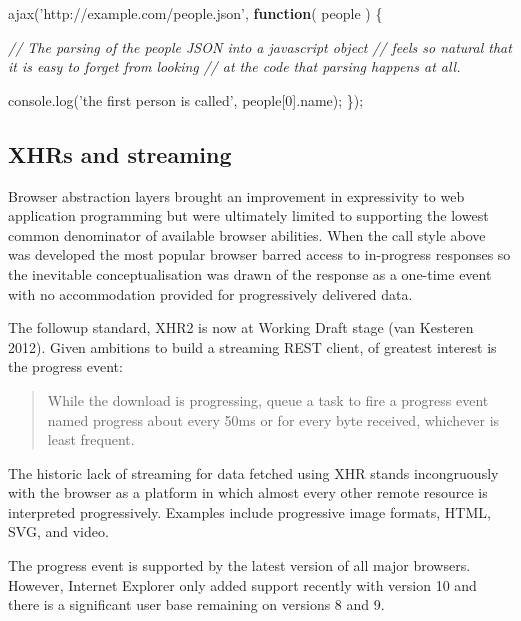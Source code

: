 \documentclass[12pt, ]{article}
\newenvironment{Shaded}{}{}
\newcommand{\KeywordTok}[1]{\textcolor[rgb]{0.00,0.44,0.13}{\textbf{{#1}}}}
\newcommand{\DecValTok}[1]{\textcolor[rgb]{0.25,0.63,0.44}{{#1}}}
\newcommand{\StringTok}[1]{\textcolor[rgb]{0.25,0.44,0.63}{{#1}}}
\newcommand{\CommentTok}[1]{\textcolor[rgb]{0.38,0.63,0.69}{\textit{{#1}}}}
\newcommand{\OtherTok}[1]{\textcolor[rgb]{0.00,0.44,0.13}{{#1}}}
\newcommand{\FunctionTok}[1]{\textcolor[rgb]{0.02,0.16,0.49}{{#1}}}
\newcommand{\NormalTok}[1]{{#1}}
\begin{document}
\begin{Shaded}
\begin{Highlighting}[]
\FunctionTok{ajax}\NormalTok{(}\StringTok{'http://example.com/people.json'}\NormalTok{, }\KeywordTok{function}\NormalTok{( people ) \{}

   \CommentTok{// The parsing of the people JSON into a javascript object}
   \CommentTok{// feels so natural that it is easy to forget from looking }
   \CommentTok{// at the code that parsing happens at all. }
   
   \OtherTok{console}\NormalTok{.}\FunctionTok{log}\NormalTok{(}\StringTok{'the first person is called'}\NormalTok{, people[}\DecValTok{0}\NormalTok{].}\FunctionTok{name}\NormalTok{);}
\NormalTok{\});}
\end{Highlighting}
\end{Shaded}

\subsection{XHRs and streaming}\label{xhrs-and-streaming}

\label{xhrsandstreaming}

Browser abstraction layers brought an improvement in expressivity to web
application programming but were ultimately limited to supporting the
lowest common denominator of available browser abilities. When the call
style above was developed the most popular browser barred access to
in-progress responses so the inevitable conceptualisation was drawn of
the response as a one-time event with no accommodation provided for
progressively delivered data.

The followup standard, XHR2 is now at Working Draft stage (van Kesteren
2012). Given ambitions to build a streaming REST client, of greatest
interest is the progress event:

\begin{quote}
While the download is progressing, queue a task to fire a progress event
named progress about every 50ms or for every byte received, whichever is
least frequent.
\end{quote}

The historic lack of streaming for data fetched using XHR stands
incongruously with the browser as a platform in which almost every other
remote resource is interpreted progressively. Examples include
progressive image formats, HTML, SVG, and video.

The progress event is supported by the latest version of all major
browsers. However, Internet Explorer only added support recently with
version 10 and there is a significant user base remaining on versions 8
and 9.
\end{document}
